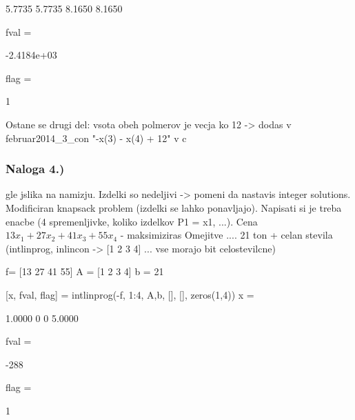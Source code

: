 \documentclass[a4paper,11pt]{article}
\begin{document}
    5.7735    5.7735    8.1650    8.1650


fval =

  -2.4184e+03


flag =

     1

Ostane se drugi del: vsota obeh polmerov je vecja ko 12 -> dodas v februar2014\_3\_con "-x(3) - x(4) + 12" v c


\subsubsection{Naloga 4.)}

gle jslika na namizju. Izdelki so nedeljivi -> pomeni da nastavis integer solutions. Modificiran knapsack problem (izdelki se lahko ponavljajo). Napisati si je treba enacbe (4 spremenljivke, koliko izdelkov P1 = x1, ...).
Cena $13x_1  +27x_2 + 41x_3 + 55x_4$ - maksimiziras
Omejitve .... 21 ton + celan stevila (intlinprog, inlincon -> [1 2 3 4] ... vse morajo bit celostevilcne) 

f= [13 27 41 55]
A = [1 2 3 4]
b = 21

[x, fval, flag] = intlinprog(-f, 1:4, A,b, [], [], zeros(1,4))
x =

    1.0000
         0
         0
    5.0000

fval =

  -288

flag =

     1
\end{document}
